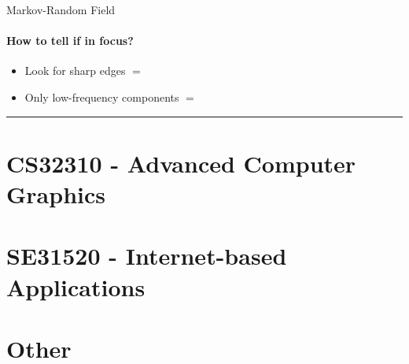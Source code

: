 \documentclass[paper=a4, fontsize=11pt]{article} %
\numberwithin{equation}{section} %
\numberwithin{figure}{section} %
\numberwithin{table}{section} %
\begin{document}
Markov-Random Field

\paragraph{How to tell if in focus?}
\begin{itemize}
\item Look for sharp edges $=$ \checkmark
\item Only low-frequency components $=$ 
\end{itemize}

\rule{\textwidth}{1pt}


\section{CS32310 - Advanced Computer Graphics}


\section{SE31520 - Internet-based Applications}



\section{Other}

\end{document}

